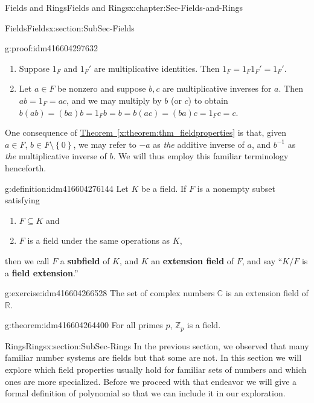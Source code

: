 \documentclass[oneside,10pt,]{book}
\newcommand{\terminology}[1]{\textbf{#1}}
\numberwithin{equation}{section}
\newcommand{\set}[1]{\left\{ {#1} \right\}}
\def\C{{\mathbb C}}
\def\Z{{\mathbb Z}}
\def\R{{\mathbb R}}
\begin{document}
\begin{chapterptx}{Fields and Rings}{}{Fields and Rings}{}{}{x:chapter:Sec-Fields-and-Rings}
\begin{sectionptx}{Fields}{}{Fields}{}{}{x:section:SubSec-Fields}
\begin{proofptx}{}{g:proof:idm416604297632}
\begin{enumerate}
\item{}Suppose \(1_F\) and \(1_F'\) are multiplicative identities. Then \(1_F = 1_F 1_F' = 1_F'\).%
\item{}Let \(a\in F\) be nonzero and suppose \(b,c\) are multiplicative inverses for \(a\). Then \(ab = 1_F = ac\), and we may multiply by \(b\) (or \(c\)) to obtain \(b(ab) = (ba)b = 1_F b = b = b(ac) = (ba)c = 1_F c = c\).%
\end{enumerate}
\end{proofptx}
One consequence of \hyperref[x:theorem:thm_fieldproperties]{Theorem~\ref{x:theorem:thm_fieldproperties}} is that, given \(a\in F\), \(b\in F\setminus \set{0}\), we may refer to \(-a\) as \emph{the} additive inverse of \(a\), and \(b^{-1}\) as \emph{the} multiplicative inverse of \(b\). We will thus employ this familiar terminology henceforth.%
\begin{definition}{}{g:definition:idm416604276144}%
Let \(K\) be a field. If \(F\) is a nonempty subset satisfying%
\begin{enumerate}
\item{}\(F\subseteq K\) and%
\item{}\(F\) is a field under the same operations as \(K\),%
\end{enumerate}
%
\par
then we call \(F\) a \terminology{subfield} of \(K\), and \(K\) an \terminology{extension field} of \(F\), and say ``\(K/F\) is a \terminology{field extension}.''%
\end{definition}
\begin{inlineexercise}{}{g:exercise:idm416604266528}%
The set of complex numbers \(\C\) is an extension field of \(\R\).%
\end{inlineexercise}
\begin{theorem}{}{}{g:theorem:idm416604264400}%
For all primes \(p\), \(\Z_p\) is a field.%
\end{theorem}
\end{sectionptx}
%
%
\typeout{************************************************}
\typeout{************************************************}
%
\begin{sectionptx}{Rings}{}{Rings}{}{}{x:section:SubSec-Rings}
In the previous section, we observed that many familiar number systems are fields but that some are not. In this section we will explore which field properties usually hold for familiar sets of numbers and which ones are more specialized. Before we proceed with that endeavor we will give a formal definition of polynomial so that we can include it in our exploration.%

\end{sectionptx}
\end{chapterptx}
\end{document}
